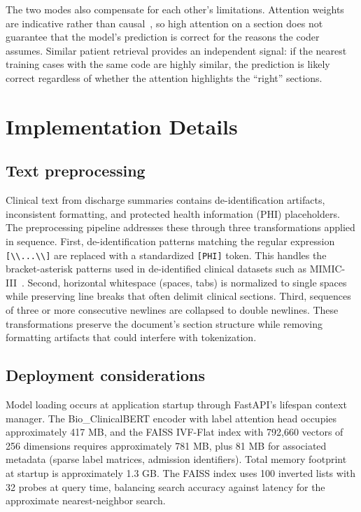\documentclass[conference]{IEEEtran}
\begin{document}
The two modes also compensate for each other's limitations. Attention weights are indicative rather than causal~\cite{b_jain2019}, so high attention on a section does not guarantee that the model's prediction is correct for the reasons the coder assumes. Similar patient retrieval provides an independent signal: if the nearest training cases with the same code are highly similar, the prediction is likely correct regardless of whether the attention highlights the ``right'' sections.

\section{Implementation Details}

\subsection{Text preprocessing}

Clinical text from discharge summaries contains de-identification artifacts, inconsistent formatting, and protected health information (PHI) placeholders. The preprocessing pipeline addresses these through three transformations applied in sequence. First, de-identification patterns matching the regular expression \texttt{[\textbackslash*\textbackslash*...\textbackslash*\textbackslash*]} are replaced with a standardized \texttt{[PHI]} token. This handles the bracket-asterisk patterns used in de-identified clinical datasets such as MIMIC-III~\cite{b_mimic}. Second, horizontal whitespace (spaces, tabs) is normalized to single spaces while preserving line breaks that often delimit clinical sections. Third, sequences of three or more consecutive newlines are collapsed to double newlines. These transformations preserve the document's section structure while removing formatting artifacts that could interfere with tokenization.

\subsection{Deployment considerations}

Model loading occurs at application startup through FastAPI's lifespan context manager. The Bio\_ClinicalBERT encoder with label attention head occupies approximately 417 MB, and the FAISS IVF-Flat index with 792,660 vectors of 256 dimensions requires approximately 781 MB, plus 81 MB for associated metadata (sparse label matrices, admission identifiers). Total memory footprint at startup is approximately 1.3 GB. The FAISS index uses 100 inverted lists with 32 probes at query time, balancing search accuracy against latency for the approximate nearest-neighbor search.
\end{document}
